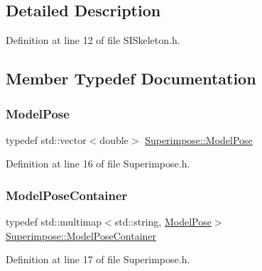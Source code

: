 \subsection{Detailed Description}


Definition at line 12 of file S\+I\+Skeleton.\+h.



\subsection{Member Typedef Documentation}
\mbox{\label{classSuperimpose_a85d40a5caf19f486d1e0c15c0a025378}} 
\subsubsection{\texorpdfstring{Model\+Pose}{ModelPose}}
{\footnotesize\ttfamily typedef std\+::vector$<$double$>$ \mbox{\hyperlink{classSuperimpose_a85d40a5caf19f486d1e0c15c0a025378}{Superimpose\+::\+Model\+Pose}}\hspace{0.3cm}{\ttfamily [inherited]}}



Definition at line 16 of file Superimpose.\+h.

\mbox{\label{classSuperimpose_a178e3d4e2def6635bfcf9454dd4b5d22}} 
\subsubsection{\texorpdfstring{Model\+Pose\+Container}{ModelPoseContainer}}
{\footnotesize\ttfamily typedef std\+::multimap$<$std\+::string, \mbox{\hyperlink{classSuperimpose_a85d40a5caf19f486d1e0c15c0a025378}{Model\+Pose}}$>$ \mbox{\hyperlink{classSuperimpose_a178e3d4e2def6635bfcf9454dd4b5d22}{Superimpose\+::\+Model\+Pose\+Container}}\hspace{0.3cm}{\ttfamily [inherited]}}



Definition at line 17 of file Superimpose.\+h.

\mbox{\label{classSuperimpose_a1e02e0225687b42296dcfee4eadf8a55}} 
